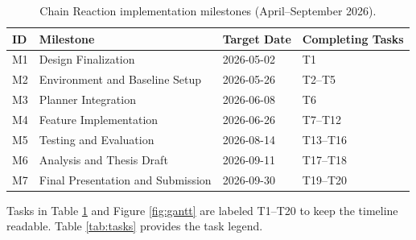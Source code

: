 \documentclass[conference]{IEEEtran}
\begin{document}
\begin{table}[t!]
\centering
\caption{Chain Reaction implementation milestones (April--September 2026).}
\label{tab:milestones}
\scriptsize
\setlength{\tabcolsep}{6pt}
\renewcommand{\arraystretch}{1.2}
\begin{tabularx}{\textwidth}{l l l X}
\toprule
\textbf{ID} & \textbf{Milestone} & \textbf{Target Date} & \textbf{Completing Tasks} \\
\midrule
M1 & Design Finalization & 2026-05-02 & T1 \\
M2 & Environment and Baseline Setup & 2026-05-26 & T2--T5 \\
M3 & Planner Integration & 2026-06-08 & T6 \\
M4 & Feature Implementation & 2026-06-26 & T7--T12 \\
M5 & Testing and Evaluation & 2026-08-14 & T13--T16 \\
M6 & Analysis and Thesis Draft & 2026-09-11 & T17--T18 \\
M7 & Final Presentation and Submission & 2026-09-30 & T19--T20 \\
\bottomrule
\end{tabularx}
\end{table}

\noindent Tasks in Table \ref{tab:milestones} and Figure \ref{fig:gantt} are labeled T1--T20 to keep the timeline readable. Table \ref{tab:tasks} provides the task legend.
\end{document}
